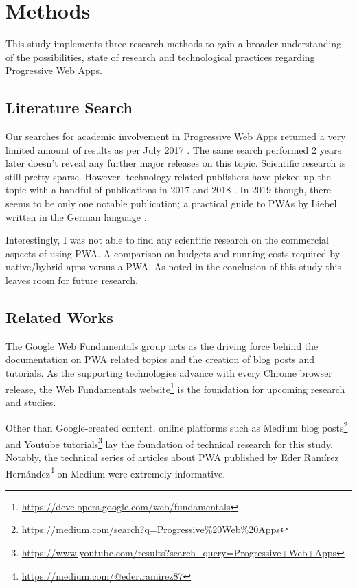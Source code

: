 \chapter{Methods}

This study implements three research methods to gain a broader understanding of the possibilities, state of research and technological practices regarding Progressive Web Apps.

\section{Literature Search}

Our searches for academic involvement in Progressive Web Apps returned a very limited amount of results as per July 2017 \citep{biorn-hansenProgressiveWebApps2018}. The same search performed 2 years later doesn't reveal any further major releases on this topic. Scientific research is still pretty sparse. However, technology related publishers have picked up the topic with a handful of publications in 2017 and 2018 \citep{humeProgressiveWebApps2018,aterBuildingProgressiveWeb2017}. In 2019 though, there seems to be only one notable publication; a practical guide to PWAs by Liebel written in the German language \citep{liebelProgressiveWebApps2019}.

Interestingly, I was not able to find any scientific research on the commercial aspects of using PWA. A comparison on budgets and running costs required by native/hybrid apps versus a PWA. As noted in the conclusion of this study this leaves room for future research.

\section{Related Works}
The Google Web Fundamentals group acts as the driving force behind the documentation on PWA related topics and the creation of blog posts and tutorials. As the supporting technologies advance with every Chrome browser release, the Web Fundamentals website\footnote{\url{https://developers.google.com/web/fundamentals}} is the foundation for upcoming research and studies.

Other than Google-created content, online platforms such as Medium blog posts\footnote{\url{https://medium.com/search?q=Progressive\%20Web\%20Apps}} and Youtube tutorials\footnote{\url{https://www.youtube.com/results?search_query=Progressive+Web+Apps}} lay the foundation of technical research for this study. Notably, the technical series of articles about PWA published by Eder Ramírez Hernández\footnote{\url{https://medium.com/@eder.ramirez87}} on Medium were extremely informative.

